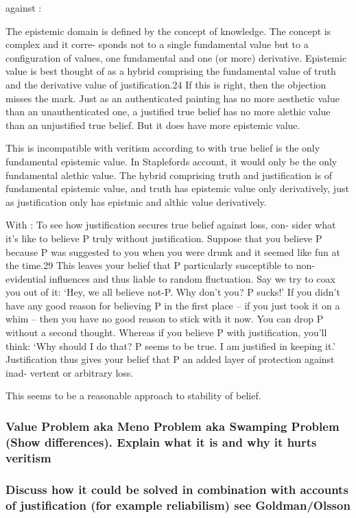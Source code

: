 \documentclass[12pt,numbers=noenddot]{scrartcl}
\begin{document}
against \textcite[291]{Stapleford2016}:

The epistemic domain is defined by the concept of knowledge. The concept is complex and it corre- sponds not to a single fundamental value but to a configuration of values, one fundamental and one (or more) derivative. Epistemic value is best thought of as a hybrid comprising the fundamental value of truth and the derivative value of justification.24 If this is right, then the objection misses the mark. Just as an authenticated painting has no more aesthetic value than an unauthenticated one, a justified true belief has no more alethic value than an unjustified true belief. But it does have more epistemic value.

This is incompatible with veritism according to with true belief is the only fundamental epistemic value. In Staplefords account, it would only be the only fundamental alethic value. The hybrid comprising truth and justification is of fundamental epistemic value, and truth has epistemic value only derivatively, just as justification only has epistmic and althic value derivatively.

With \textcite{Stapleford2016}:
To see how justification secures true belief against loss, con- sider what it’s like to believe P truly without justification. Suppose that you believe P because P was suggested to you when you were drunk and it seemed like fun at the time.29 This leaves your belief that P particularly susceptible to non-evidential influences and thus liable to random fluctuation. Say we try to coax you out of it: ‘Hey, we all believe not-P. Why don’t you? P sucks!’ If you didn’t have any good reason for believing P in the first place – if you just took it on a whim – then you have no good reason to stick with it now. You can drop P without a second thought. Whereas if you believe P with justification, you’ll think: ‘Why should I do that? P seems to be true. I am justified in keeping it.’ Justification thus gives your belief that P an added layer of protection against inad- vertent or arbitrary loss.

This seems to be a reasonable approach to stability of belief.

\subsubsection{ Value Problem aka Meno Problem aka Swamping Problem (Show differences). Explain what it is and why it hurts veritism }
\subsubsection{ Discuss how it could be solved in combination with accounts of justification (for example reliabilism) see Goldman/Olsson}
\end{document}
